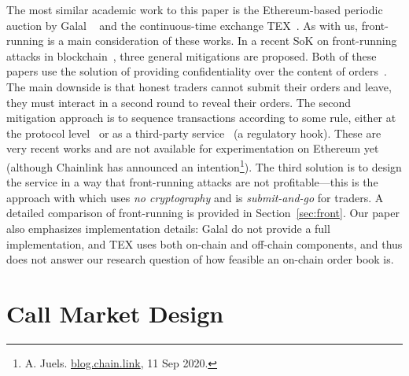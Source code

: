 The most similar academic work to this paper is the Ethereum-based periodic auction by Galal \etal~\cite{galalpublicly} and the continuous-time exchange TEX~\cite{khalil2019tex}. As with us, front-running is a main consideration of these works. In a recent SoK on front-running attacks in blockchain~\cite{eskandari2019sok}, three general mitigations are proposed. Both of these papers use the solution of providing confidentiality over the content of orders~\cite{TP07,YSLT10,TW12,cartlidge2019mpc,massacci2018futuresmex}. The main downside is that honest traders cannot submit their orders and leave, they must interact in a second round to reveal their orders. The second mitigation approach is to sequence transactions according to some rule, either at the protocol level~\cite{kelkar2020order} or as a third-party service~\cite{Kla20} (a regulatory hook). These are very recent works and are not available for experimentation on Ethereum yet (although Chainlink has announced an intention\footnote{A. Juels. \href{https://blog.chain.link/chainlink-fair-sequencing-services-enabling-a-provably-fair-defi-ecosystem/}{blog.chain.link}, 11 Sep 2020.}). The third solution is to design the service in a way that front-running attacks are not profitable---this is the approach with \cm which uses \textit{no cryptography} and is \textit{submit-and-go} for traders. A detailed comparison of front-running is provided in Section~\ref{sec:front}. Our paper also emphasizes implementation details: Galal \etal do not provide a full implementation, and TEX uses both on-chain and off-chain components, and thus does not answer our research question of how feasible an on-chain order book is.





\section{Call Market Design}



